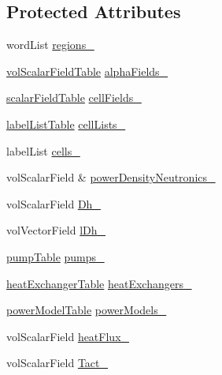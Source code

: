 \subsection*{Protected Attributes}
\begin{DoxyCompactItemize}
\item 
word\+List \hyperlink{classFoam_1_1structure_a1cbd024d79c53570b3e04cc2e4f0abd3}{regions\+\_\+}
\item 
\hyperlink{classFoam_1_1structure_a821486e30c5f9ed2852aeddc4ff8ff30}{vol\+Scalar\+Field\+Table} \hyperlink{classFoam_1_1structure_a8ddca6cc34b86786d9370b225a5a7e8e}{alpha\+Fields\+\_\+}
\item 
\hyperlink{classFoam_1_1structure_a2fdb5cf3126746b10e53fb86215f3249}{scalar\+Field\+Table} \hyperlink{classFoam_1_1structure_a7136e90f04e342e45cde90d74b7e296e}{cell\+Fields\+\_\+}
\item 
\hyperlink{classFoam_1_1structure_afefd20eeb8d2675bfba9c1ce9aa78ca7}{label\+List\+Table} \hyperlink{classFoam_1_1structure_adbcc8a0fc193681fc80b55dee1f8d5b2}{cell\+Lists\+\_\+}
\item 
label\+List \hyperlink{classFoam_1_1structure_a668e23f1aa896d53b68f6182e48f32d9}{cells\+\_\+}
\item 
vol\+Scalar\+Field \& \hyperlink{classFoam_1_1structure_a70eafb5d670fefbe4115321567671063}{power\+Density\+Neutronics\+\_\+}
\item 
vol\+Scalar\+Field \hyperlink{classFoam_1_1structure_a756541524cb4e87ec3823d173aab0675}{Dh\+\_\+}
\item 
vol\+Vector\+Field \hyperlink{classFoam_1_1structure_ad394169e8f50e599cab1a73138d0fd79}{l\+Dh\+\_\+}
\item 
\hyperlink{classFoam_1_1structure_a3cad7e6a25055d05c668b06551d372c5}{pump\+Table} \hyperlink{classFoam_1_1structure_a6d3127c82b86b076dc03459b1c07cb3e}{pumps\+\_\+}
\item 
\hyperlink{classFoam_1_1structure_a22ffcc3b5fb77bcb044a05e138ec4076}{heat\+Exchanger\+Table} \hyperlink{classFoam_1_1structure_a8bed91afa878a475acee3bd862315af3}{heat\+Exchangers\+\_\+}
\item 
\hyperlink{classFoam_1_1structure_a5b1d82b72cd629a4695e6c44b37da7a7}{power\+Model\+Table} \hyperlink{classFoam_1_1structure_a7997eb980796e45c86549228b08730c7}{power\+Models\+\_\+}
\item 
vol\+Scalar\+Field \hyperlink{classFoam_1_1structure_a152fbbd517b80ae251b415ddc38cb03f}{heat\+Flux\+\_\+}
\item 
vol\+Scalar\+Field \hyperlink{classFoam_1_1structure_a01d6a4bb2749a27e36668b204ac96b3e}{Tact\+\_\+}

\end{DoxyCompactItemize}
